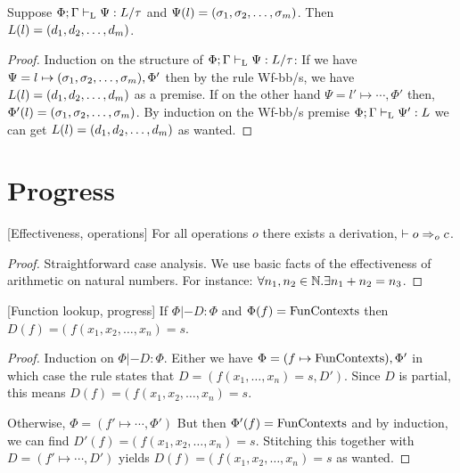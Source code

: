 \documentclass[a4paper, oneside, 10pt, draft]{memoir}
\begin{document}
\begin{lem}
  \label{lem:tpbb-lookup}
  Suppose $\Phi;\Gamma |-_{\mathrm{L}} \Psi : L / \tau$ and $\Psi(l) =
  (\sigma_1, \sigma_2, \dotsc, \sigma_m)$. Then $L(l) = (d_1, d_2, \dotsc, d_m)$.
\end{lem}
\begin{proof}
  Induction on the structure of $\Phi;\Gamma |-_{\mathrm{L}} \Psi : L / \tau$:
  If we have $\Psi = l \mapsto (\sigma_1, \sigma_2, \dotsc, \sigma_m), \Phi'$ then by the rule Wf-bb/s, we
  have $L(l) = (d_1, d_2, \dotsc, d_m)$ as a premise. If on the other hand $\Psi = l'
  \mapsto \dotsb, \Phi'$ then, $\Phi'(l) = (\sigma_1, \sigma_2, \dotsc, \sigma_m)$. By induction on
  the Wf-bb/s premise $\Phi;\Gamma |-_{\mathrm{L}} \Psi' : L$ we can get $L(l) =
  (d_1, d_2, \dotsc, d_m)$ as wanted.
\end{proof}

\section{Progress}

\begin{lem}{[Effectiveness, operations]}
  \label{lem:can-step-op}
  For all operations $o$ there exists a derivation, $|- o =>_{o} c$.
\end{lem}
\begin{proof}
  Straightforward case analysis. We use basic facts of the
  effectiveness of arithmetic on natural numbers. For instance:
  $\forall n_1, n_2 \in \mathbb{N} . \exists n_1 + n_2 = n_3$.
\end{proof}

\begin{lem}{[Function lookup, progress]}
  \label{lem:phi-lookup-good}
  If $\Phi |- D : \Phi$ and $\Phi(f) = \mathrm{Fun Contexts}$ then $D(f) = (\; f(x_1,
  x_2, \dotsc, x_n) = s$.
\end{lem}
\begin{proof}
  Induction on $\Phi |- D : \Phi$. Either we have $\Phi = (f \mapsto
  \mathrm{Fun Contexts}),\Phi'$ in which case the rule states that $D = (f(x_1,
  \dotsc, x_n) = s, D')$. Since $D$ is partial, this means $D(f) = (\; f(x_1,
  x_2, \dotsc, x_n) = s$.

  Otherwise, $\Phi = (f' \mapsto \dotsb, \Phi')$ But then $\Phi'(f) =
  \mathrm{Fun Contexts}$ and by induction, we can find $D'(f) = (\; f(x_1,
  x_2, \dotsc, x_n) = s$. Stitching this together with $D = (f'
  \mapsto \dotsb, D')$ yields $D(f) = (\; f(x_1,  x_2, \dotsc, x_n) =
  s$ as wanted.
\end{proof}
\end{document}
